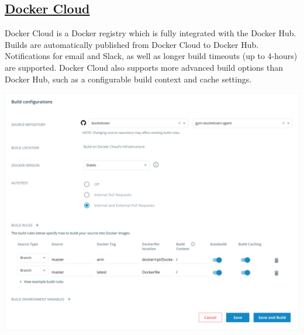 \subsection{\href{https://cloud.docker.com/}{Docker Cloud}}

Docker Cloud is a Docker registry which is fully integrated with the Docker Hub. Builds are automatically published from Docker Cloud to Docker Hub. Notifications for email and Slack, as well as longer build timeouts (up to 4-hours) are supported. Docker Cloud also supports more advanced build options than Docker Hub, such as a configurable build context and cache settings.\\

\begin{centering}
\includegraphics[width=\textwidth]{../figures/docker_cloud.png}
\end{centering}
